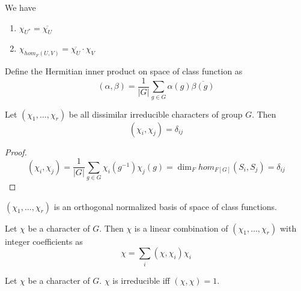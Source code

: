 \documentclass[12pt]{book}
\begin{document}
	\begin{corollary}
	We have
		\begin{enumerate}
			\item $\chi_{U^*}=\overline{\chi_U}$
			\item $\chi_{hom_F(U,V)}=\overline{\chi_{U}}\cdot\chi_V$
		\end{enumerate}
	\end{corollary}
	\begin{definition}
		Define the Hermitian inner product on space of class function as 
		\begin{equation}
			(\alpha,\beta)=\frac 1{|G|}\sum_{g\in G}\alpha(g)\overline{\beta(g)}
		\end{equation}
	\end{definition}
	
	\begin{theorem}
		Let $(\chi_1,\dots,\chi_r)$ be all dissimilar irreducible characters of group $G$. Then
		\begin{equation}
			(\chi_i,\chi_j)=\delta_{ij}
		\end{equation}
	\end{theorem}
	
	\begin{proof}
		\begin{equation}
			(\chi_i,\chi_j)=\frac 1{|G|}\sum_{g\in G} \chi_i(g^{-1})\chi_j(g)=\dim_F hom_{F[G]}(S_i,S_j)=\delta_{ij}
		\end{equation}
	\end{proof}
	\begin{corollary}
		$(\chi_1,\dots,\chi_r)$ is an orthogonal normalized basis of space of class functions.
	\end{corollary}
	\begin{corollary}
		Let $\chi$ be a character of $G$. Then $\chi$ is a linear combination of $(\chi_1,\dots,\chi_r)$ with integer coefficients as 
		\begin{equation}
			\chi=\sum_i (\chi,\chi_i)\chi_i
		\end{equation}
	\end{corollary}
	\begin{corollary}
		Let $\chi$ be a character of $G$. $\chi$ is irreducible iff $(\chi,\chi)=1$.
	\end{corollary}
	
\end{document}
